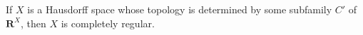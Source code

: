 If $X$ is a Hausdorff space whose topology is determined by some subfamily $C'$ of $\mathbf{R}^X$, then $X$ is completely regular.

